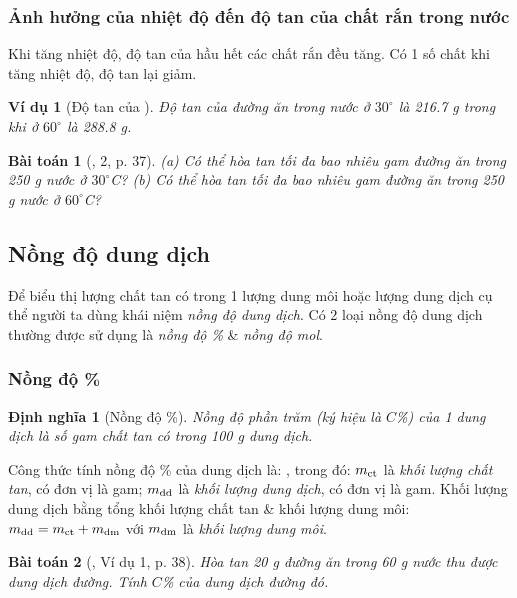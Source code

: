 \documentclass{article}
\newtheorem{baitoan}{Bài toán}
\newtheorem{dinhnghia}{Định nghĩa}
\newtheorem{vidu}{Ví dụ}
\begin{document}
\subsubsection{Ảnh hưởng của nhiệt độ đến độ tan của chất rắn trong nước}
Khi tăng nhiệt độ, độ tan của hầu hết các chất rắn đều tăng. Có 1 số chất khi tăng nhiệt độ, độ tan lại giảm.

\begin{vidu}[Độ tan của ]
	Độ tan của đường ăn trong nước ở $30^\circ$ là \emph{216.7 g} trong khi ở $60^\circ$ là \emph{288.8 g}.
\end{vidu}

\begin{baitoan}[\cite{SGK_KHTN_8_Canh_Dieu}, 2, p. 37]
	(a) Có thể hòa tan tối đa bao nhiêu gam đường ăn trong \emph{250 g} nước ở $30^\circ$C? (b) Có thể hòa tan tối đa bao nhiêu gam đường ăn trong \emph{250 g} nước ở $60^\circ$C?
\end{baitoan}

\subsection{Nồng độ dung dịch}
Để biểu thị lượng chất tan có trong 1 lượng dung môi hoặc lượng dung dịch cụ thể người ta dùng khái niệm \textit{nồng độ dung dịch}. Có 2 loại nồng độ dung dịch thường được sử dụng là \textit{nồng độ \%} \& \textit{nồng độ mol}.

\subsubsection{Nồng độ \%}

\begin{dinhnghia}[Nồng độ \%]
	\emph{Nồng độ phần trăm} (ký hiệu là $C$\%) của 1 dung dịch là số gam chất tan có trong \emph{100 g} dung dịch.
\end{dinhnghia}
Công thức tính nồng độ \% của dung dịch là: , trong đó: $m_{\rm ct}$ là \textit{khối lượng chất tan}, có đơn vị là gam; $m_{\rm dd}$ là \textit{khối lượng dung dịch}, có đơn vị là gam. Khối lượng dung dịch bằng tổng khối lượng chất tan \& khối lượng dung môi: $m_{\rm dd} = m_{\rm ct} + m_{\rm dm}$ với $m_{\rm dm}$ là \textit{khối lượng dung môi}.

\begin{baitoan}[\cite{SGK_KHTN_8_Canh_Dieu}, Ví dụ 1, p. 38]
	Hòa tan \emph{20 g} đường ăn trong \emph{60 g} nước thu được dung dịch đường. Tính $C$\% của dung dịch đường đó.
\end{baitoan}
\end{document}
